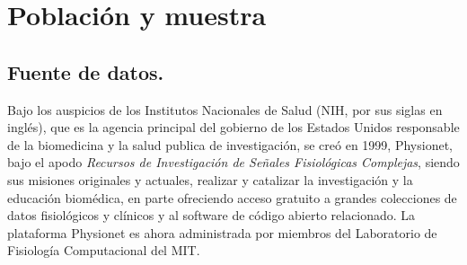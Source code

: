 \documentclass[12pt,letterpaper,oneside,openright]{book}
\begin{document}
\section{Población y muestra}

\subsection{Fuente de datos.}
Bajo los auspicios de los Institutos Nacionales de Salud (NIH, por sus siglas en inglés), que es la agencia principal del gobierno de los Estados Unidos responsable de la biomedicina y la salud publica de investigación, se creó en 1999, Physionet, bajo el apodo \emph{Recursos de Investigación de Señales Fisiológicas Complejas}, siendo sus misiones originales y actuales, realizar y catalizar la investigación y la educación biomédica, en parte ofreciendo acceso gratuito a grandes colecciones de datos fisiológicos y clínicos y al software de código abierto relacionado. La plataforma Physionet es ahora administrada por miembros del Laboratorio de Fisiología Computacional del MIT. 
\end{document}
